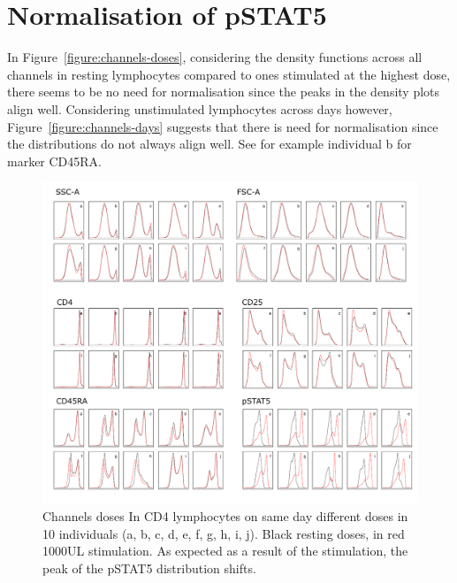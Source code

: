 \section{Normalisation of pSTAT5}

In Figure~\ref{figure:channels-doses}, considering the density functions across all channels in resting lymphocytes compared to ones stimulated at the highest dose,
there seems to be no need for normalisation since the peaks in the density plots align well.
Considering unstimulated lymphocytes across days however, Figure~\ref{figure:channels-days} suggests that there is need for normalisation since the distributions do not always align well.
See for example individual b for marker CD45RA.

\begin{figure}[h]
    \centering
    \includegraphics[scale=.75]{IL2/figures/channels-doses.pdf}
    {Channels doses}
    {
    In CD4 lymphocytes on same day different doses in 10 individuals (a, b, c, d, e, f, g, h, i, j).
  Black resting doses, in red 1000UL stimulation. As expected as a result of the stimulation, the peak of the pSTAT5 distribution shifts. }
\end{figure}


